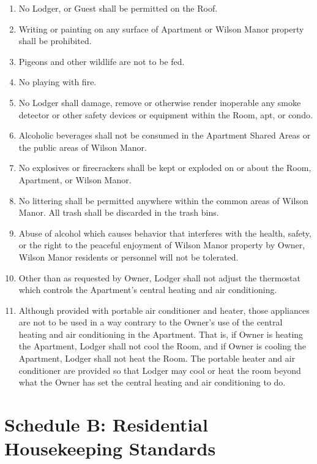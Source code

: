 \documentclass[12pt,letterpaper]{article}
\newcommand{\lodger}{Lodger}
\newcommand{\standards}{Residential Housekeeping Standards}
\newcommand{\condo}{Wilson Manor}
\newcommand{\apt}{Apartment}
\newcommand{\room}{Room}
\newcommand{\shared}{Apartment Shared Areas}
\begin{document}
\begin{enumerate}
	\item	No \lodger{}, or Guest shall be permitted on the Roof. 
	\item Writing or painting on any surface of \apt{} or \condo{} property shall be prohibited. 
	\item Pigeons and other wildlife are not to be fed. 
	\item No playing with fire. 
	\item No \lodger{} shall damage, remove or otherwise render inoperable any smoke detector or other safety devices or equipment within the \room{}, apt{}, or condo{}. 
	\item Alcoholic beverages shall not be consumed in the \shared{} or the public areas of \condo{}. 
	\item No explosives or firecrackers shall be kept or exploded on or about the \room{}, \apt{}, or \condo{}. 
	\item No littering shall be permitted anywhere within the common areas of \condo{}. All trash shall be discarded in the trash bins. 
	\item Abuse of alcohol which causes behavior that interferes with the health, safety, or the right to the peaceful enjoyment of \condo{} property by Owner, \condo{} residents or personnel will not be tolerated. 
	\item Other than as requested by Owner, \lodger{} shall not adjust the thermostat which controls the \apt{}'s central heating and air conditioning.
	\item Although provided with portable air conditioner and heater, those appliances are not to be used in a way contrary to the Owner's use of the central heating and air conditioning in the \apt{}. That is, if Owner is heating the \apt{}, \lodger{} shall not cool the \room{}, and if Owner is cooling the \apt{}, \lodger{} shall not heat the \room{}. The portable heater and air conditioner are provided so that \lodger{} may cool or heat the room beyond what the Owner has set the central heating and air conditioning to do.
\end{enumerate}


\newpage
\section*{Schedule B: \standards{}} \label{standards}
\end{document}
